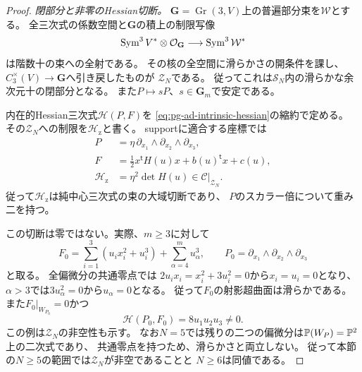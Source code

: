 \begin{proof}
\emph{閉部分と非零のHessian切断。}
$\mathbf G=\operatorname{Gr}(3,V)$上の普遍部分束を$\mathcal W$とする。
全三次式の係数空間と$\mathbf G$の積上の制限写像
\begin{equation}
 \operatorname{Sym}^3V^*\otimes\mathcal O_{\mathbf G}
 \longrightarrow\operatorname{Sym}^3\mathcal W^*
 \label{eq:pg-intrinsic-zero-restriction-surjection}
\end{equation}
は階数十の束への全射である。
その核の全空間に滑らかさの開条件を課し、
$C_3^\times(V)\to\mathbf G$へ引き戻したものが
$\mathcal Z_N$である。
従ってこれは$\mathcal S_N$内の滑らかな余次元十の閉部分となる。
また$P\mapsto sP$、$s\in\mathbf G_m$で安定である。

内在的Hessian三次式$\mathscr H(P,F)$を
\eqref{eq:pg-ad-intrinsic-hessian}の縮約で定める。
その$\mathcal Z_N$への制限を$\mathscr H_{\mathrm z}$と書く。
supportに適合する座標では
\begin{equation}
 \begin{aligned}
 P&=\eta\,\partial_{x_1}\wedge\partial_{x_2}\wedge\partial_{x_3},\\
 F&=\tfrac12 x^{\mathsf t}H(u)x+b(u)^{\mathsf t}x+c(u),\\
 \mathscr H_{\mathrm z}&=\eta^2\det H(u)
       \in\mathcal C|_{\mathcal Z_N}.
 \end{aligned}
 \label{eq:pg-intrinsic-zero-hessian-pure-central}
\end{equation}
従って$\mathscr H_{\mathrm z}$は純中心三次式の束の大域切断であり、
$P$のスカラー倍について重み二を持つ。

この切断は零ではない。実際、$m\ge3$に対して
\begin{equation}
 F_0=\sum_{i=1}^3(u_ix_i^2+u_i^3)
          +\sum_{\alpha=4}^m u_\alpha^3,\qquad
 P_0=\partial_{x_1}\wedge\partial_{x_2}\wedge\partial_{x_3}
 \label{eq:pg-intrinsic-zero-obstruction-example}
\end{equation}
と取る。
全偏微分の共通零点では
$2u_ix_i=x_i^2+3u_i^2=0$から$x_i=u_i=0$となり、
$\alpha>3$では$3u_\alpha^2=0$から$u_\alpha=0$となる。
従って$F_0$の射影超曲面は滑らかである。
また$F_0|_{W_{P_0}}=0$かつ
\begin{equation}
 \mathscr H(P_0,F_0)=8u_1u_2u_3\ne0.
 \label{eq:pg-intrinsic-zero-nonzero-hessian}
\end{equation}
この例は$\mathcal Z_N$の非空性も示す。
なお$N=5$では残りの二つの偏微分は$\mathbb P(W_P)=\mathbb P^2$上の二次式であり、
共通零点を持つため、滑らかさと両立しない。
従って本節の$N\ge5$の範囲では$\mathcal Z_N$が非空であることと
$N\ge6$は同値である。


\end{proof}
